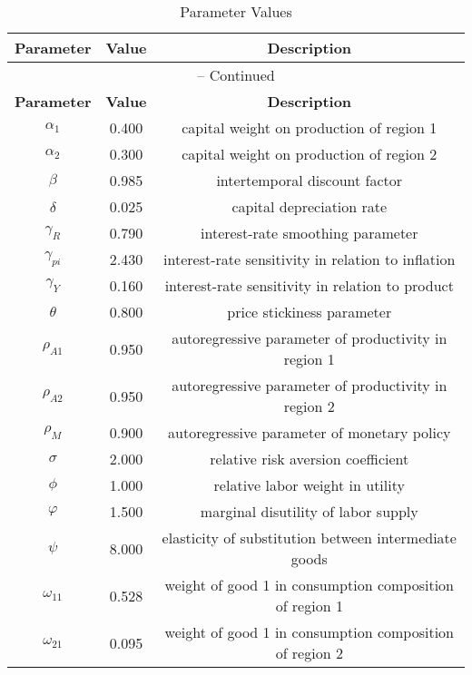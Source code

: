 \begin{center}
\begin{longtable}{ccc}
\caption{Parameter Values}\\%
\toprule%
\multicolumn{1}{c}{\textbf{Parameter}} &
\multicolumn{1}{c}{\textbf{Value}} &
 \multicolumn{1}{c}{\textbf{Description}}\\%
\midrule%
\endfirsthead
\multicolumn{3}{c}{{\tablename} \thetable{} -- Continued}\\%
\midrule%
\multicolumn{1}{c}{\textbf{Parameter}} &
\multicolumn{1}{c}{\textbf{Value}} &
  \multicolumn{1}{c}{\textbf{Description}}\\%
\midrule%
\endhead
${\alpha_{1}}$ 	 & 	 0.400 	 & 	 capital weight on production of region 1\\
${\alpha_{2}}$ 	 & 	 0.300 	 & 	 capital weight on production of region 2\\
${\beta}$ 	 & 	 0.985 	 & 	 intertemporal discount factor\\
${\delta}$ 	 & 	 0.025 	 & 	 capital depreciation rate\\
${\gamma_{R}}$ 	 & 	 0.790 	 & 	 interest-rate smoothing parameter\\
${\gamma_{pi}}$ 	 & 	 2.430 	 & 	 interest-rate sensitivity in relation to inflation\\
${\gamma_{Y}}$ 	 & 	 0.160 	 & 	 interest-rate sensitivity in relation to product\\
${\theta}$ 	 & 	 0.800 	 & 	 price stickiness parameter\\
${\rho_{A1}}$ 	 & 	 0.950 	 & 	 autoregressive parameter of productivity in region 1\\
${\rho_{A2}}$ 	 & 	 0.950 	 & 	 autoregressive parameter of productivity in region 2\\
${\rho_{M}}$ 	 & 	 0.900 	 & 	 autoregressive parameter of monetary policy\\
${\sigma}$ 	 & 	 2.000 	 & 	 relative risk aversion coefficient\\
${\phi}$ 	 & 	 1.000 	 & 	 relative labor weight in utility\\
${\varphi}$ 	 & 	 1.500 	 & 	 marginal disutility of labor supply\\
${\psi}$ 	 & 	 8.000 	 & 	 elasticity of substitution between intermediate goods\\
${\omega_{11}}$ 	 & 	 0.528 	 & 	 weight of good 1 in consumption composition of region 1\\
${\omega_{21}}$ 	 & 	 0.095 	 & 	 weight of good 1 in consumption composition of region 2\\

\end{longtable}
\end{center}
